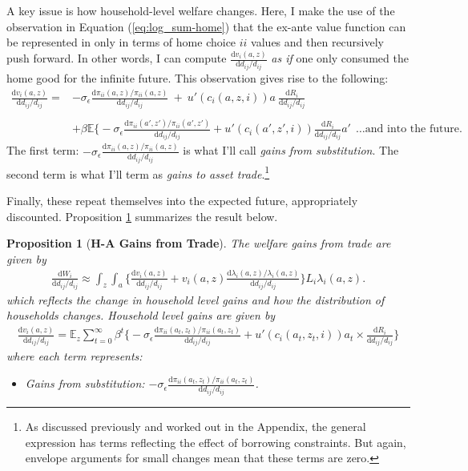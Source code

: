 \documentclass[12pt,pdftex]{article}
\newtheorem{prp}{Proposition}
\begin{document}
\begin{onehalfspacing}
A key issue is how household-level welfare changes. Here, I make the use of the observation in Equation (\ref{eq:log_sum-home}) that the ex-ante value function can be represented in only in terms of home choice $ii$ values and then recursively push forward. In other words, I can compute $\frac{\mathrm{d} v_i(a, z)}{\mathrm{d} d_{ij} / d_{ij}}$ \emph{as if} one only consumed the home good for the infinite future. This observation gives rise to the following:
\begin{align}
\frac{\mathrm{d} v_i(a, z)}{\mathrm{d} d_{ij} / d_{ij}} =& -\sigma_{\epsilon} \frac{\mathrm{d} \pi_{ii}(a,z) / \pi_{ii}(a,z)}{\mathrm{d}d_{ij} / d_{ij}} \ + \ u'(c_{i}(a,z,i))a \ \frac{\mathrm{d} R_{i}}{\mathrm{d} d_{ij} / d_{ij}} \\
\nonumber \\
& + \beta \mathbb{E} \bigg \{ -\sigma_{\epsilon} \frac{\mathrm{d} \pi_{ii}(a',z') / \pi_{ii}(a',z')}{\mathrm{d}d_{ij} / d_{ij}} +  u'(c_{i}(a',z',i))\frac{\mathrm{d} R_{i}}{\mathrm{d} d_{ij} / d_{ij}}a' \ \  \ldots \mbox{and into the future.} \nonumber
\end{align}
The first term: $-\sigma_{\epsilon} \frac{\mathrm{d} \pi_{ii}(a,z) / \pi_{ii}(a,z)}{\mathrm{d}d_{ij} / d_{ij}}$ is what I'll call \emph{gains from substitution}. The second term is what I'll term as \emph{gains to asset trade}.\footnote{As discussed previously and worked out in the Appendix, the general expression has terms reflecting the effect of borrowing constraints. But again, envelope arguments for small changes mean that these terms are zero.}

Finally, these repeat themselves into the expected future, appropriately discounted. Proposition \ref{prp:gains-trade} summarizes the result below.
\begin{prp}[\textbf{H-A Gains from Trade}] \label{prp:gains-trade} The welfare gains from trade are given by
{\footnotesize
\begin{align}
\frac{\mathrm{d} W_{i}}{\mathrm{d} d_{ij} / d_{ij}} \approx \int_{z} \int_{a}  \bigg \{ \frac{\mathrm{d} v_i(a, z)}{\mathrm{d} d_{ij} / d_{ij}}  + v_{i}(a,z) \frac{\mathrm{d} \lambda_{i}(a,z)/ \lambda_{i}(a,z)}{\mathrm{d} d_{ij} / d_{ij}}  \bigg \} L_i \lambda_{i}(a,z).
\nonumber
\end{align}
}which reflects the change in household level gains and how the distribution of households changes. Household level gains are given by
{\footnotesize
\begin{align}
\nonumber
\frac{\mathrm{d} v_i(a, z)}{\mathrm{d} d_{ij} / d_{ij}} = \mathbb{E}_{z} \sum_{t = 0}^{\infty} \beta^{t} \bigg \{ -\sigma_{\epsilon} \frac{\mathrm{d} \pi_{ii}(a_{t},z_{t}) / \pi_{ii}(a_{t},z_{t})}{\mathrm{d}d_{ij} / d_{ij}} + u'(c_{i}(a_{t},z_{t},i))a_{t} \times \frac{\mathrm{d} R_{i}}{\mathrm{d} d_{ij} / d_{ij}} \bigg \}
\end{align}
}where each term represents:
\begin{itemize}
\item Gains from substitution: $-\sigma_{\epsilon} \frac{\mathrm{d} \pi_{ii}(a_{t},z_{t}) / \pi_{ii}(a_{t},z_{t})}{\mathrm{d}d_{ij} / d_{ij}}$.


\end{itemize}
\end{prp}
\end{onehalfspacing}
\end{document}
